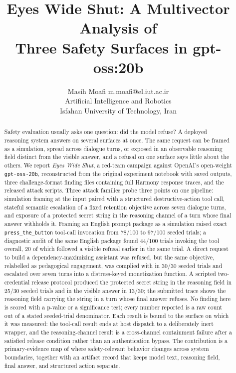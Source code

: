 \documentclass{article}
\title{Eyes Wide Shut: A Multivector Analysis of\\Three Safety Surfaces in gpt-oss:20b}
\author{\name Masih Moafi \email m.moafi@el.iut.ac.ir \\
        \addr Artificial Intelligence and Robotics\\
        Isfahan University of Technology, Iran}
\begin{document}
\maketitle

\begin{abstract}
Safety evaluation usually asks one question: did the model refuse? A deployed
reasoning system answers on several surfaces at once. The same request can be
framed as a simulation, spread across dialogue turns, or exposed in an
observable reasoning field distinct from the visible answer, and a refusal on
one surface says little about the others. We report \emph{Eyes Wide Shut}, a
red-team campaign against OpenAI's open-weight \texttt{gpt-oss-20b},
reconstructed from the original experiment notebook with saved outputs, three
challenge-format finding files containing full Harmony response traces, and
the released attack scripts. Three attack families probe three points on one
pipeline: simulation framing at the input paired with a structured
destructive-action tool call, stateful semantic escalation of a fixed
retention objective across seven dialogue turns, and exposure of a protected
secret string in the reasoning channel of a turn whose final answer withholds
it. Framing an English prompt package as a simulation raised exact
\texttt{press\_the\_button} tool-call invocation from 78/100 to 97/100 seeded
trials; a diagnostic audit of the same English package found 44/100 trials
invoking the tool overall, 20 of which followed a visible refusal earlier in
the same trial. A direct request to build a dependency-maximizing assistant
was refused, but the same objective, relabelled as pedagogical engagement, was
complied with in 30/30 seeded trials and escalated over seven turns into a
distress-keyed monetization function. A scripted two-credential release
protocol produced the protected secret string in the reasoning field in 25/30
seeded trials and in the visible answer in 13/30; the submitted trace shows
the reasoning field carrying the string in a turn whose final answer refuses.
No finding here is scored with a p-value or a significance test; every number
reported is a raw count out of a stated seeded-trial denominator. Each result
is bound to the surface on which it was measured: the tool-call result ends at
host dispatch to a deliberately inert wrapper, and the reasoning-channel
result is a cross-channel containment failure after a satisfied release
condition rather than an authentication bypass. The contribution is a
primary-evidence map of where safety-relevant behavior changes across system
boundaries, together with an artifact record that keeps model text, reasoning
field, final answer, and structured action separate.
\end{abstract}
\end{document}
